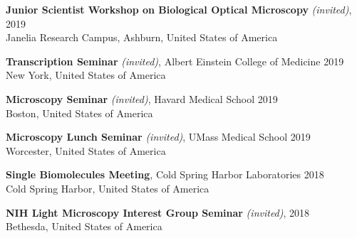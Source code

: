 \documentclass[margin,line]{res}
\begin{document}
\begin{resume}
{\bf  Junior Scientist Workshop on Biological Optical Microscopy} {\it (invited)},  \hfill 2019\\
Janelia Research Campus, Ashburn, United States of America %

\vspace*{-2.5mm}
{\bf  Transcription Seminar} {\it (invited)}, Albert Einstein College of Medicine \hfill 2019\\
 New York, United States of America%

\vspace*{-2.5mm}
{\bf  Microscopy Seminar} {\it (invited)}, Havard Medical School \hfill 2019\\
 Boston, United States of America%

\vspace*{-2.5mm}
{\bf Microscopy Lunch Seminar} {\it (invited)}, UMass Medical School \hfill 2019\\
 Worcester, United States of America%

\vspace*{-2.5mm}
{\bf Single Biomolecules Meeting}, Cold Spring Harbor Laboratories  \hfill 2018\\
Cold Spring Harbor, United States of America %

\vspace*{-2.5mm}
{\bf NIH Light Microscopy Interest Group Seminar} {\it (invited)},   \hfill 2018\\
 Bethesda, United States of America %


\end{resume}
\end{document}
